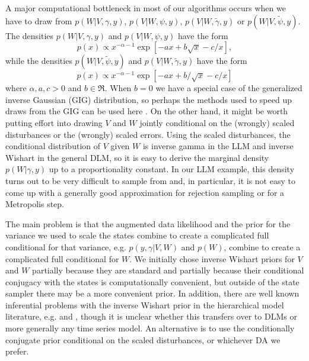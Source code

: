 \documentclass[12pt]{article}
\begin{document}
A major computational bottleneck in most of our algorithms occurs when we have to draw from $p(W|V,\gamma,y)$, $p(V|W,\psi,y)$, $p(V|W,\tilde{\gamma},y)$ or $p(W|V,\tilde{\psi},y)$. The densities $p(W|V,\gamma,y)$ and $p(V|W,\psi,y)$ have the form
\[
p(x)\propto x^{-\alpha-1}\exp\left[-ax + b\sqrt{x} - c/x\right],
\]
while the densities $p(W|V,\tilde{\psi},y)$ and $p(V|W,\tilde{\gamma},y)$ have the form
\[
p(x)\propto x^{-\alpha-1}\exp\left[ -ax + b/\sqrt{x} -c/x\right]
\]
where $\alpha,a,c>0$ and $b\in\Re$. When $b=0$ we have a special case of the generalized inverse Gaussian (GIG) distribution, so perhaps the methods used to speed up draws from the GIG can be used here \citep{jorgensen1982statistical,dagpunar1989easily,devroye2012random}. On the other hand, it might be worth putting effort into drawing $V$ and $W$ jointly conditional on the (wrongly) scaled disturbances or the (wrongly) scaled errors. Using the scaled disturbances, the conditional distribution of $V$ given $W$ is inverse gamma in the LLM and inverse Wishart in the general DLM, so it is easy to derive the marginal density $p(W|\gamma,y)$ up to a proportionality constant. In our LLM example, this density turns out to be very difficult to sample from and, in particular, it is not easy to come up with a generally good approximation for rejection sampling or for a Metropolis step.

The main problem is that the augmented data likelihood and the prior for the variance we used to scale the states combine to create a complicated full conditional for that variance, e.g. $p(y,\gamma|V,W)$ and $p(W)$, combine to create a complicated full conditional for $W$. We initially chose inverse Wishart priors for $V$ and $W$ partially because they are standard and partially because their conditional conjugacy with the states is computationally convenient, but outside of the state sampler there may be a more convenient prior. In addition, there are well known inferential problems with the inverse Wishart prior in the hierarchical model literature, e.g. \citet{gelman2006prior} and \citet{alvarez2014cov}, though it is unclear whether this transfers over to DLMs or more generally any time series model. An alternative is to use the conditionally conjugate prior conditional on the scaled disturbances, or whichever DA we prefer.
\end{document}
